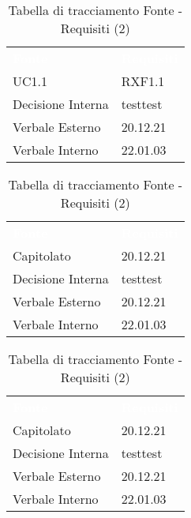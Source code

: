 \begin{table}[!htbp]
\renewcommand{\arraystretch}{1.5}
\begin{tabular}{ m{}<{\centering}  m{}<{\centering} }
	\rowcolor{darkblue}
	\textcolor{white}{\textbf{Fonte}} &\textcolor{white}{\textbf{Requisiti}}\\ 

	UC1.1 & RXF1.1\\	

	\rowcolor{gray!10} Decisione Interna & testtest\\
	
	Verbale Esterno & 20.12.21\\
	
	\rowcolor{gray!10} Verbale Interno & 22.01.03 \\

\end{tabular}
\begin{tabular}{ m{}<{\centering}  m{}<{\centering} }
	\rowcolor{darkblue}
	\textcolor{white}{\textbf{Fonte}} &\textcolor{white}{\textbf{Requisiti}}\\ 

	Capitolato & 20.12.21\\	

	\rowcolor{gray!10} Decisione Interna & testtest \\
	
	Verbale Esterno & 20.12.21\\
	
	\rowcolor{gray!10} Verbale Interno & 22.01.03 \\

\end{tabular}
\begin{tabular}{ m{}<{\centering}  m{}<{\centering} }
	\rowcolor{darkblue}
	\textcolor{white}{\textbf{Fonte}} &\textcolor{white}{\textbf{Requisiti}}\\ 

	Capitolato & 20.12.21\\	

	\rowcolor{gray!10} Decisione Interna & testtest \\
	
	Verbale Esterno & 20.12.21\\
	
	\rowcolor{gray!10} Verbale Interno & 22.01.03 \\

\end{tabular}
\caption{Tabella di tracciamento Fonte - Requisiti (2)}
\end{table}

